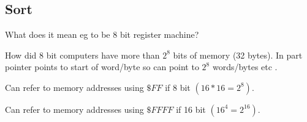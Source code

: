 
\subsection{Sort}


What does it mean eg to be 8 bit register machine?

How did 8 bit computers have more than \(2^8\) bits of memory (32 bytes).
In part pointer points to start of word/byte so can point to \(2^8\) words/bytes etc .

Can refer to memory addresses using \(\$FF\) if 8 bit \((16*16=2^8)\).


Can refer to memory addresses using \(\$FFFF\) if 16 bit \((16^4 = 2^16)\).


